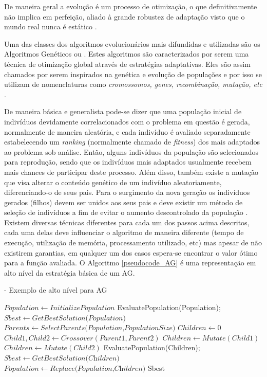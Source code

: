 De maneira geral a evolução é um processo de otimização, o que definitivamente não implica em perfeição, aliado à grande robustez de adaptação visto que o mundo real nunca é estático \cite{Book-Back2000}.

Uma das classes dos algoritmos evolucionários mais difundidas e utilizadas são os Algoritmos Genéticos ou . Estes algoritmos são caracterizados por serem uma técnica de otimização global através de estratégias adaptativas. Eles são assim chamados por serem inspirados na genética e evolução de populações e por isso se utilizam de nomenclaturas como \emph{cromossomos, genes, recombinação, mutação, etc} \cite{Book-Brownlee2011}.

De maneira básica e generalista pode-se dizer que uma população inicial de indivíduos devidamente correlacionados com o problema em questão é gerada, normalmente de maneira aleatória, e cada indivíduo é avaliado separadamente estabelecendo um \emph{ranking} (normalmente chamado de \emph{fitness}) dos mais adaptados ao problema sob análise. Então, alguns indivíduos da população são selecionados para reprodução, sendo que os indivíduos mais adaptados usualmente recebem mais chances de participar deste processo. Além disso, também existe a mutação que visa alterar o conteúdo genético de um indivíduo aleatoriamente, diferenciando-o de seus pais. Para o surgimento da nova geração os indivíduos gerados (filhos) devem ser unidos aos seus pais e deve existir um método de seleção de indivíduos a fim de evitar o aumento descontrolado da população \cite{Book-Back2000}. Existem diversas técnicas diferentes para cada um dos passos acima descritos, cada uma delas deve influenciar o algoritmo de maneira diferente (tempo de execução, utilização de memória, processamento utilizado, etc) mas apesar de não existirem garantias, em qualquer um dos casos espera-se encontrar o valor ótimo para a função avaliada. O Algoritmo \ref{pseudocode_AG} é uma representação em alto nível da estratégia básica de um AG. 

\begin{algorithm} [h]
\caption{ - Exemplo de alto nível para AG}
\begin{algorithmic}[1]
\State $Population\gets \textit{InitializePopulation}$
\State EvaluatePopulation(Population);
\State $Sbest\gets \textit{GetBestSolution(Population)}$
\State $Parents\gets \textit{SelectParents(Population,PopulationSize)}$
\State $Children\gets 0$
\State $Child1, Child2 \gets Crossover(Parent1, Parent2)$
\State $Children \gets Mutate(Child1)$
\State $Children \gets Mutate(Child2)$
\EndFor
\State EvaluatePopulation(Children);
\State $Sbest\gets \textit{GetBestSolution(Children)}$
\State $Population\gets \textit{Replace(Population,Children)}$
\EndWhile
\State\Return Sbest
\end{algorithmic}
\label{pseudocode_AG}
\end{algorithm}


